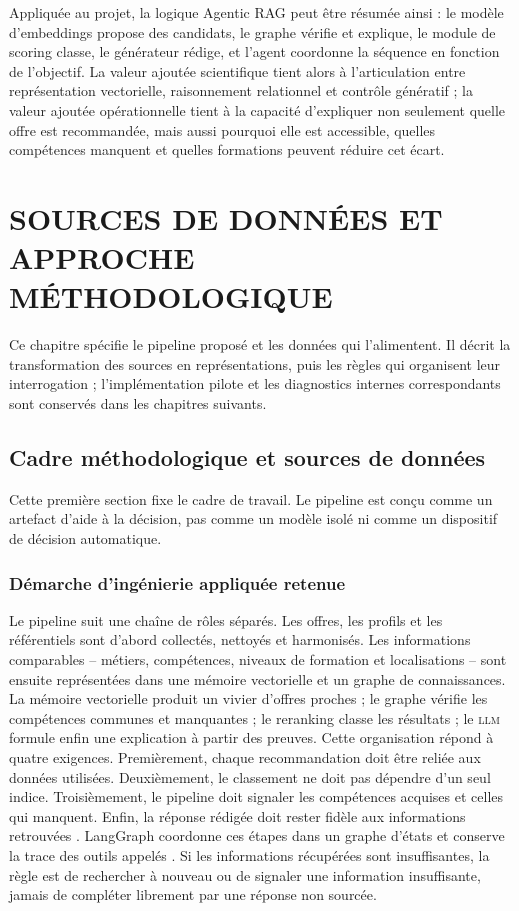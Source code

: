 \documentclass[12pt,twoside]{report}
\newcommand{\LLM}{\textsc{llm}}
\begin{document}
Appliquée au projet, la logique Agentic RAG peut être résumée ainsi : le modèle d'embeddings propose des candidats, le graphe vérifie et explique, le module de scoring classe, le générateur rédige, et l'agent coordonne la séquence en fonction de l'objectif. La valeur ajoutée scientifique tient alors à l'articulation entre représentation vectorielle, raisonnement relationnel et contrôle génératif ; la valeur ajoutée opérationnelle tient à la capacité d'expliquer non seulement quelle offre est recommandée, mais aussi pourquoi elle est accessible, quelles compétences manquent et quelles formations peuvent réduire cet écart.


\fi

\chapter{SOURCES DE DONNÉES ET APPROCHE MÉTHODOLOGIQUE}
Ce chapitre spécifie le pipeline proposé et les données qui l'alimentent. Il décrit la transformation des sources en représentations, puis les règles qui organisent leur interrogation ; l'implémentation pilote et les diagnostics internes correspondants sont conservés dans les chapitres suivants.

\section{Cadre méthodologique et sources de données}
Cette première section fixe le cadre de travail. Le pipeline est conçu comme un artefact d'aide à la décision, pas comme un modèle isolé ni comme un dispositif de décision automatique.

\subsection{Démarche d'ingénierie appliquée retenue}

Le pipeline suit une chaîne de rôles séparés. Les offres, les profils et les référentiels sont d'abord collectés, nettoyés et harmonisés. Les informations comparables -- métiers, compétences, niveaux de formation et localisations -- sont ensuite représentées dans une mémoire vectorielle et un graphe de connaissances. La mémoire vectorielle produit un vivier d'offres proches ; le graphe vérifie les compétences communes et manquantes ; le reranking classe les résultats ; le \LLM{} formule enfin une explication à partir des preuves.
Cette organisation répond à quatre exigences. Premièrement, chaque recommandation doit être reliée aux données utilisées. Deuxièmement, le classement ne doit pas dépendre d'un seul indice. Troisièmement, le pipeline doit signaler les compétences acquises et celles qui manquent. Enfin, la réponse rédigée doit rester fidèle aux informations retrouvées \cite{lewis2020rag,es2024ragas}. LangGraph coordonne ces étapes dans un graphe d'états et conserve la trace des outils appelés \cite{langgraphdocs2026}. Si les informations récupérées sont insuffisantes, la règle est de rechercher à nouveau ou de signaler une information insuffisante, jamais de compléter librement par une réponse non sourcée.
\end{document}
